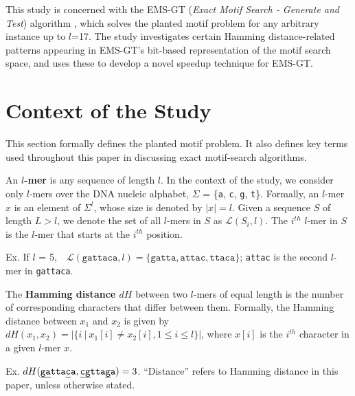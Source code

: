 \documentclass[oneside,12pt]{DISCSthesis}
\begin{document}
		This study is concerned with the EMS-GT (\emph{Exact Motif Search - Generate and Test}) algorithm \cite{nabos2015dissertation}, which solves the planted motif problem for any arbitrary instance up to $l$=17. The study investigates certain Hamming distance-related patterns appearing in EMS-GT's bit-based representation of the motif search space, and uses these to develop a novel speedup technique for EMS-GT.
		\newpage

	\section{Context of the Study}
		This section formally defines the planted motif problem. It also defines key terms used throughout this paper in discussing exact motif-search algorithms.\vspace{5mm}


		\noindent An \textbf{\boldmath $l$-mer} is any sequence of length $l$. In the context of the study, we consider only $l$-mers over the DNA nucleic alphabet, $\Sigma$ = \{\texttt{a}, \texttt{c}, \texttt{g}, \texttt{t}\}. Formally, an $l$-mer $x$ is an element of $\Sigma^l$, whose size is denoted by $|x| = l$. Given a sequence $S$ of length $L > l$, we denote the set of all $l$-mers in $S$ as $\mathcal{L}(S_i, l)$. The $i^{th}$ $l$-mer in $S$ is the $l$-mer that starts at the $i^{th}$ position.

		\noindent \hspace*{35pt} Ex. If $l$ = 5,\ \ $\mathcal{L}(\texttt{gattaca}, l)= \{\texttt{gatta},\texttt{attac},\texttt{ttaca}\}$;
		\newline\hspace*{55pt}	\texttt{attac} is the second $l$-mer in \texttt{gattaca}.\newline


		\noindent The \textbf{\boldmath Hamming distance $dH$} between two $l$-mers of equal length is the number of corresponding characters that differ between them. Formally, the Hamming distance between $x_1$ and $x_2$ is given by $ dH(x_1, x_2) = | \{i\ |\ x_1[i] \neq x_2[i], 1 \leq i \leq l\} |$, where $x[i]$ is the $i^{th}$ character in a given $l$-mer $x$.

		\noindent \hspace*{35pt} Ex. $dH(\texttt{\ul{ga}tta\ul{c}a}, \texttt{\ul{cg}tta\ul{g}a}) = 3$. \newline
		\noindent ``Distance'' refers to Hamming distance in this paper, unless otherwise stated.\newline
\end{document}
